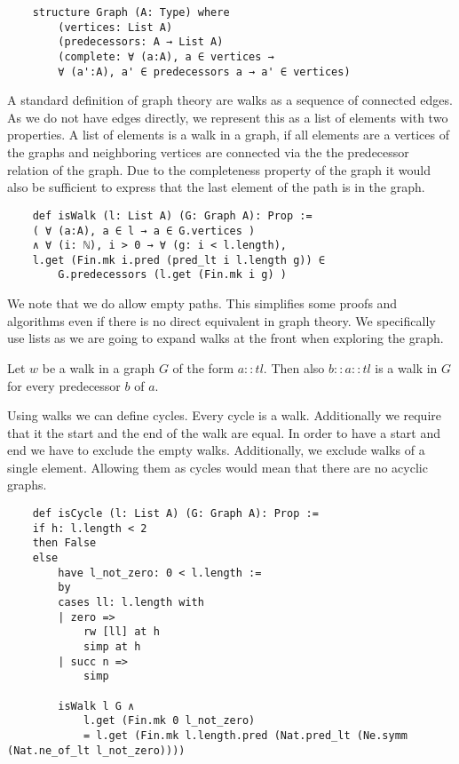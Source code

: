\begin{lstlisting}
    structure Graph (A: Type) where
        (vertices: List A)
        (predecessors: A → List A)
        (complete: ∀ (a:A), a ∈ vertices →  
        ∀ (a':A), a' ∈ predecessors a → a' ∈ vertices)
\end{lstlisting}

A standard definition of graph theory are walks as a sequence of connected edges. As we do not have edges directly, we represent this as a list of elements with two properties. A list of elements is a walk in a graph, if all elements are a vertices of the graphs and neighboring vertices are connected via the the predecessor relation of the graph. Due to the completeness property of the graph it would also be sufficient to express that the last element of the path is in the graph. 

\begin{lstlisting}
    def isWalk (l: List A) (G: Graph A): Prop :=
    ( ∀ (a:A), a ∈ l → a ∈ G.vertices ) 
    ∧ ∀ (i: ℕ), i > 0 → ∀ (g: i < l.length), 
    l.get (Fin.mk i.pred (pred_lt i l.length g)) ∈ 
        G.predecessors (l.get (Fin.mk i g) )
\end{lstlisting}

We note that we do allow empty paths. This simplifies some proofs and algorithms even if there is no direct equivalent in graph theory. We specifically use lists as we are going to expand walks at the front when exploring the graph.  

\begin{lemma}
    Let $w$ be a walk in a graph $G$ of the form $a::tl$. Then also $b::a::tl$ is a walk in $G$ for every predecessor $b$ of $a$.
\end{lemma}

Using walks we can define cycles. Every cycle is a walk. Additionally we require that it the start and the end of the walk are equal. In order to have a start and end we have to exclude the empty walks. Additionally, we exclude walks of a single element. Allowing them as cycles would mean that there are no acyclic graphs.

\begin{lstlisting}
    def isCycle (l: List A) (G: Graph A): Prop :=
    if h: l.length < 2
    then False
    else
        have l_not_zero: 0 < l.length :=
        by
        cases ll: l.length with
        | zero =>
            rw [ll] at h
            simp at h
        | succ n =>
            simp

        isWalk l G ∧
            l.get (Fin.mk 0 l_not_zero) 
            = l.get (Fin.mk l.length.pred (Nat.pred_lt (Ne.symm (Nat.ne_of_lt l_not_zero))))
\end{lstlisting}

